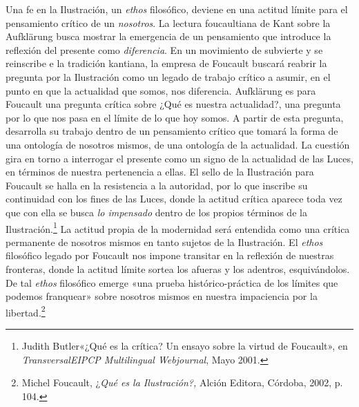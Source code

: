 Una fe en la Ilustración, un \emph{ethos} filosófico, deviene en una actitud límite para el pensamiento crítico de un \emph{nosotros}. La lectura foucaultiana de Kant sobre la Aufklärung busca mostrar la emergencia de un pensamiento que introduce la reflexión del presente como \emph{diferencia}. En un movimiento de subvierte y se reinscribe e la tradición kantiana, la empresa de Foucault buscará reabrir la pregunta por la Ilustración como un legado de trabajo crítico a asumir, en el punto en que la actualidad que somos, nos diferencia. Aufklärung es para Foucault una pregunta crítica sobre ¿Qué es nuestra actualidad?, una pregunta por lo que nos pasa en el límite de lo que hoy somos. A partir de esta pregunta, desarrolla su trabajo dentro de un pensamiento crítico que tomará la forma de una ontología de nosotros mismos, de una ontología de la actualidad. La cuestión gira en torno a interrogar el presente como un signo de la actualidad de las Luces, en términos de nuestra pertenencia a ellas. El sello de la Ilustración para Foucault se halla en la resistencia a la autoridad, por lo que inscribe su continuidad con los fines de las Luces, donde la actitud crítica aparece toda vez que con ella se busca \emph{lo impensado} dentro de los propios términos de la Ilustración.\footnote{Judith Butler«¿Qué es la crítica? Un ensayo sobre la virtud de Foucault», en \emph{TransversalEIPCP Multilingual Webjournal}, Mayo 2001.} La actitud propia de la modernidad será entendida como una crítica permanente de nosotros mismos en tanto sujetos de la Ilustración. El \emph{ethos} filosófico legado por Foucault nos impone transitar en la reflexión de nuestras fronteras, donde la actitud límite sortea los afueras y los adentros, esquivándolos. De tal \emph{ethos} filosófico emerge «una prueba histórico-práctica de los límites que podemos franquear» sobre nosotros mismos en nuestra impaciencia por la libertad.\footnote{Michel Foucault, ¿\emph{Qué es la Ilustración?,} Alción Editora, Córdoba, 2002, p. 104.}

